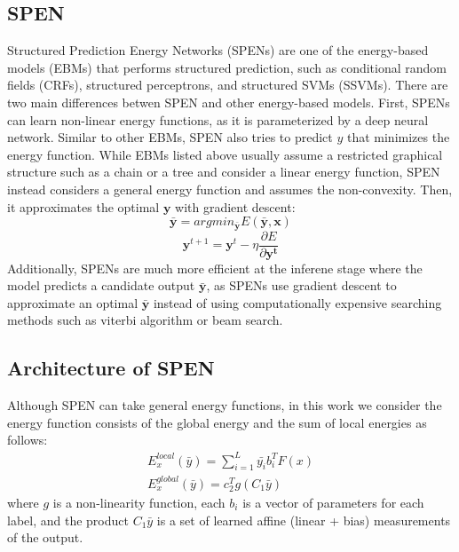 \documentclass[11pt,letterpaper]{article}
\begin{document}
\subsection{SPEN}
Structured Prediction Energy Networks (SPENs) \cite{DBLP:journals/corr/BelangerM15}\cite{belanger2017end} are one of the energy-based models (EBMs) that performs structured prediction, such as conditional random fields (CRFs), structured perceptrons, and structured SVMs (SSVMs).
There are two main differences betwen SPEN and other energy-based models. First, SPENs can learn non-linear energy functions, as it is parameterized by a deep neural network. Similar to other EBMs, SPEN also tries to predict $y$ that minimizes the energy function. While EBMs listed above usually assume a restricted graphical structure such as a chain or a tree and consider a linear energy function, SPEN instead considers a general energy function and assumes the non-convexity. Then, it approximates the optimal $\mathbf{y}$ with gradient descent:
\begin{equation}
\mathbf{\bar{y}} = argmin_{\mathbf{\bar{y}}} E( \mathbf{\bar{y}}, \mathbf{x} )
\end{equation}
\begin{equation}
\mathbf{y}^{t+1} = \mathbf{y}^t - \eta \frac{ \partial E }{ \partial \mathbf{y^t}}
\end{equation}
Additionally, SPENs are much more efficient at the inferene stage where the model predicts a candidate output $\bar{\mathbf{y}}$, as SPENs use gradient descent to approximate an optimal $\bar{\mathbf{y}}$ instead of using computationally expensive searching methods such as viterbi algorithm or beam search.
\subsection{Architecture of SPEN}
Although SPEN can take general energy functions, in this work we consider the energy function consists of the global energy and the sum of local energies as follows:
\begin{align}
E_x^{local}(\bar{y}) = \sum^L_{i=1} \bar{y_i} b_i^T F(x) \\
E_x^{global}(\bar{y}) = c_2^T g(C_1 \bar{y})
\end{align}
where $g$ is a non-linearity function, each $b_i$ is a vector of parameters for each label, and the product $C_1 \bar{y}$ is a set of learned affine (linear + bias)
measurements of the output.
\end{document}
